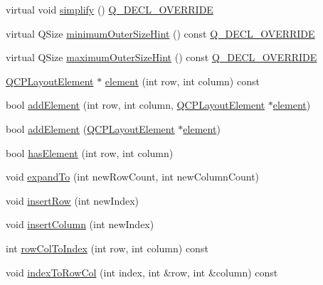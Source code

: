 \begin{DoxyCompactItemize}
\item 
virtual void \mbox{\hyperlink{class_q_c_p_layout_grid_a38621ca7aa633b6a9a88617df7f08672}{simplify}} () \mbox{\hyperlink{qcustomplot_8h_a42cc5eaeb25b85f8b52d2a4b94c56f55}{Q\+\_\+\+D\+E\+C\+L\+\_\+\+O\+V\+E\+R\+R\+I\+DE}}
\item 
virtual Q\+Size \mbox{\hyperlink{class_q_c_p_layout_grid_a0438bc58b4d3894d01db95b08d4268df}{minimum\+Outer\+Size\+Hint}} () const \mbox{\hyperlink{qcustomplot_8h_a42cc5eaeb25b85f8b52d2a4b94c56f55}{Q\+\_\+\+D\+E\+C\+L\+\_\+\+O\+V\+E\+R\+R\+I\+DE}}
\item 
virtual Q\+Size \mbox{\hyperlink{class_q_c_p_layout_grid_a41ce0014c220d77b909e2ca937f0e599}{maximum\+Outer\+Size\+Hint}} () const \mbox{\hyperlink{qcustomplot_8h_a42cc5eaeb25b85f8b52d2a4b94c56f55}{Q\+\_\+\+D\+E\+C\+L\+\_\+\+O\+V\+E\+R\+R\+I\+DE}}
\item 
\mbox{\hyperlink{class_q_c_p_layout_element}{Q\+C\+P\+Layout\+Element}} $\ast$ \mbox{\hyperlink{class_q_c_p_layout_grid_a602b426609b4411cf6a93c3ddf3a381a}{element}} (int row, int column) const
\item 
bool \mbox{\hyperlink{class_q_c_p_layout_grid_adff1a2ca691ed83d2d24a4cd1fe17012}{add\+Element}} (int row, int column, \mbox{\hyperlink{class_q_c_p_layout_element}{Q\+C\+P\+Layout\+Element}} $\ast$\mbox{\hyperlink{class_q_c_p_layout_grid_a602b426609b4411cf6a93c3ddf3a381a}{element}})
\item 
bool \mbox{\hyperlink{class_q_c_p_layout_grid_a4c44025dd25acd27e053cadfd448ad7b}{add\+Element}} (\mbox{\hyperlink{class_q_c_p_layout_element}{Q\+C\+P\+Layout\+Element}} $\ast$\mbox{\hyperlink{class_q_c_p_layout_grid_a602b426609b4411cf6a93c3ddf3a381a}{element}})
\item 
bool \mbox{\hyperlink{class_q_c_p_layout_grid_ab0cf4f7edc9414a3bfaddac0f46dc0a0}{has\+Element}} (int row, int column)
\item 
void \mbox{\hyperlink{class_q_c_p_layout_grid_a886c0dcbabd51a45da399e044552b685}{expand\+To}} (int new\+Row\+Count, int new\+Column\+Count)
\item 
void \mbox{\hyperlink{class_q_c_p_layout_grid_a48af3dd7c3a653d9c3d7dd99bd02e838}{insert\+Row}} (int new\+Index)
\item 
void \mbox{\hyperlink{class_q_c_p_layout_grid_a1e880a321dbe8b43b471ccd764433dc4}{insert\+Column}} (int new\+Index)
\item 
int \mbox{\hyperlink{class_q_c_p_layout_grid_a682ba76f130810ffd294032a1bfbcfcb}{row\+Col\+To\+Index}} (int row, int column) const
\item 
void \mbox{\hyperlink{class_q_c_p_layout_grid_a577223db920e2acb34bc1091080c76d1}{index\+To\+Row\+Col}} (int index, int \&row, int \&column) const
\end{DoxyCompactItemize}
